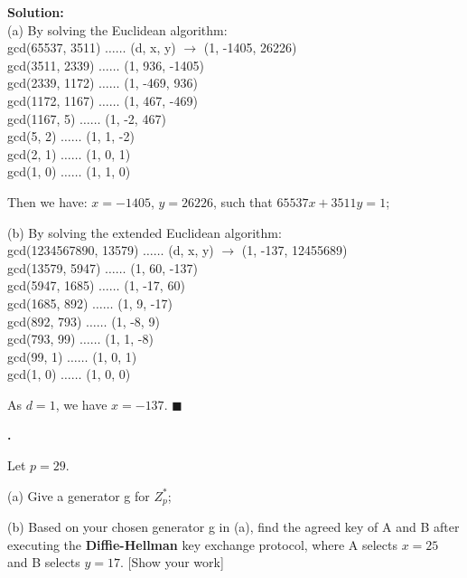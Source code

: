 \documentclass{article}
\newcounter{pcounter}                                   %
\newenvironment{problem}                                %
{                                                       %
    \stepcounter{pcounter}                              %
    \textbf{\arabic{pcounter}.}                         %
}{}                                                     %
\newenvironment{solution}                               %
{\textbf{Solution:} \\}{$\blacksquare$\newline}         %
\begin{document}
    \begin{solution}
        (a) By solving the Euclidean algorithm:\\
        gcd(65537, 3511) $\dots\dots$ (d, x, y) $\rightarrow$ (1, -1405, 26226)\\
        gcd(3511, 2339)  $\dots\dots$ (1, 936, -1405)\\
        gcd(2339, 1172)  $\dots\dots$ (1, -469, 936)\\
        gcd(1172, 1167)  $\dots\dots$ (1, 467, -469)\\
        gcd(1167, 5)     $\dots\dots$ (1, -2, 467)\\
        gcd(5, 2)        $\dots\dots$ (1, 1, -2)\\
        gcd(2, 1)        $\dots\dots$ (1, 0, 1)\\
        gcd(1, 0)        $\dots\dots$ (1, 1, 0)

        Then we have: $x=-1405$, $y=26226$, such that $65537x+3511y=1$;

        (b) By solving the extended Euclidean algorithm:\\
        gcd(1234567890, 13579) $\dots\dots$ (d, x, y) $\rightarrow$ (1, -137, 12455689)\\
        gcd(13579, 5947)       $\dots\dots$ (1, 60, -137)\\
        gcd(5947, 1685)        $\dots\dots$ (1, -17, 60)\\
        gcd(1685, 892)         $\dots\dots$ (1, 9, -17)\\
        gcd(892, 793)          $\dots\dots$ (1, -8, 9)\\
        gcd(793, 99)           $\dots\dots$ (1, 1, -8)\\
        gcd(99, 1)             $\dots\dots$ (1, 0, 1)\\
        gcd(1, 0)              $\dots\dots$ (1, 0, 0)

        As $d=1$, we have $x=-137$.
    \end{solution}

    \begin{problem}
        Let $p = 29$.

        (a) Give a generator g for $Z^*_p$;

        (b) Based on your chosen generator g in (a), find the agreed key of A and B after executing the \textbf{Diffie-Hellman} key exchange protocol, where A selects $x=25$ and B selects $y=17$. [Show your work]
    \end{problem}
    
\end{document}

